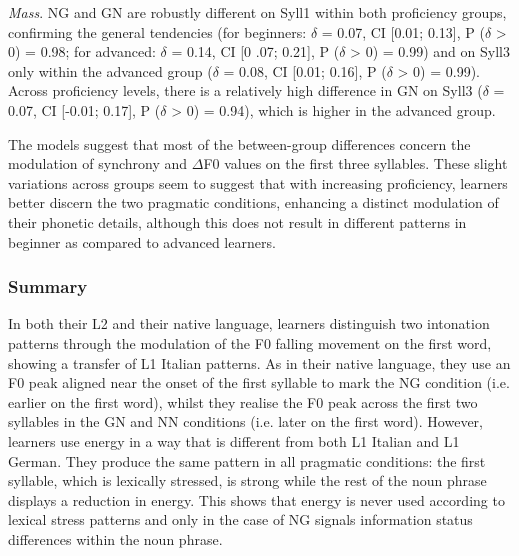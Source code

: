 \begin{listWWNumiiileveli}
\begin{stylelsBulletList}
\textit{Mass}. NG and GN are robustly different on Syll1 within both proficiency groups, confirming the general tendencies (for beginners: $\delta $ = 0.07, CI [0.01; 0.13], P ($\delta $ {\textgreater} 0) = 0.98; for advanced: $\delta $ = 0.14, CI [0 .07; 0.21], P ($\delta $ {\textgreater} 0) = 0.99) and on Syll3 only within the advanced group ($\delta $ = 0.08, CI [0.01; 0.16], P ($\delta $ {\textgreater} 0) = 0.99). Across proficiency levels, there is a relatively high difference in GN on Syll3 ($\delta $ = 0.07, CI [-0.01; 0.17], P ($\delta $ {\textgreater} 0) = 0.94), which is higher in the advanced group.
\end{stylelsBulletList}
\end{listWWNumiiileveli}
\begin{styleStandard}
The models suggest that most of the between-group differences concern the modulation of synchrony and ${\Delta}$F0 values on the first three syllables. These slight variations across groups seem to suggest that with increasing proficiency, learners better discern the two pragmatic conditions, enhancing a distinct modulation of their phonetic details, although this does not result in different patterns in beginner as compared to advanced learners. 
\end{styleStandard}

\subsubsection{Summary}
\hypertarget{Toc191305910}{}\begin{styleStandard}
In both their L2 and their native language, learners distinguish two intonation patterns through the modulation of the F0 falling movement on the first word, showing a transfer of L1 Italian patterns. As in their native language, they use an F0 peak aligned near the onset of the first syllable to mark the NG condition (i.e. earlier on the first word), whilst they realise the F0 peak across the first two syllables in the GN and NN conditions (i.e. later on the first word). However, learners use energy in a way that is different from both L1 Italian and L1 German. They produce the same pattern in all pragmatic conditions: the first syllable, which is lexically stressed, is strong while the rest of the noun phrase displays a reduction in energy. This shows that energy is never used according to lexical stress patterns and only in the case of NG signals information status differences within the noun phrase.
\end{styleStandard}


